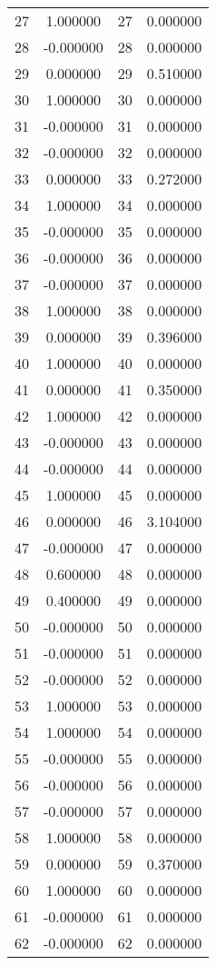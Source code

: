 \documentclass[12pt]{article}
\begin{document}
\begin{longtable}{@{}cccc@{}}
27 & 1.000000 & 27 & 0.000000 \\
28 & -0.000000 & 28 & 0.000000 \\
29 & 0.000000 & 29 & 0.510000 \\
30 & 1.000000 & 30 & 0.000000 \\
31 & -0.000000 & 31 & 0.000000 \\
32 & -0.000000 & 32 & 0.000000 \\
33 & 0.000000 & 33 & 0.272000 \\
34 & 1.000000 & 34 & 0.000000 \\
35 & -0.000000 & 35 & 0.000000 \\
36 & -0.000000 & 36 & 0.000000 \\
37 & -0.000000 & 37 & 0.000000 \\
38 & 1.000000 & 38 & 0.000000 \\
39 & 0.000000 & 39 & 0.396000 \\
40 & 1.000000 & 40 & 0.000000 \\
41 & 0.000000 & 41 & 0.350000 \\
42 & 1.000000 & 42 & 0.000000 \\
43 & -0.000000 & 43 & 0.000000 \\
44 & -0.000000 & 44 & 0.000000 \\
45 & 1.000000 & 45 & 0.000000 \\
46 & 0.000000 & 46 & 3.104000 \\
47 & -0.000000 & 47 & 0.000000 \\
48 & 0.600000 & 48 & 0.000000 \\
49 & 0.400000 & 49 & 0.000000 \\
50 & -0.000000 & 50 & 0.000000 \\
51 & -0.000000 & 51 & 0.000000 \\
52 & -0.000000 & 52 & 0.000000 \\
53 & 1.000000 & 53 & 0.000000 \\
54 & 1.000000 & 54 & 0.000000 \\
55 & -0.000000 & 55 & 0.000000 \\
56 & -0.000000 & 56 & 0.000000 \\
57 & -0.000000 & 57 & 0.000000 \\
58 & 1.000000 & 58 & 0.000000 \\
59 & 0.000000 & 59 & 0.370000 \\
60 & 1.000000 & 60 & 0.000000 \\
61 & -0.000000 & 61 & 0.000000 \\
62 & -0.000000 & 62 & 0.000000 \\

\end{longtable}
\end{document}
